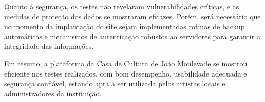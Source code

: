 Quanto à segurança, os testes não revelaram vulnerabilidades críticas, e as medidas de proteção dos dados se mostraram eficazes. Porém, será necessário que no momento da implantação do site sejam implementadas rotinas de backup automáticas e mecanismos de autenticação robustos ao servidores para garantir a integridade das informações.

Em resumo, a plataforma da Casa de Cultura de João Monlevade se mostrou eficiente nos testes realizados, com bom desempenho, usabilidade adequada e segurança confiável, estando apta a ser utilizada pelos artistas locais e administradores da instituição.